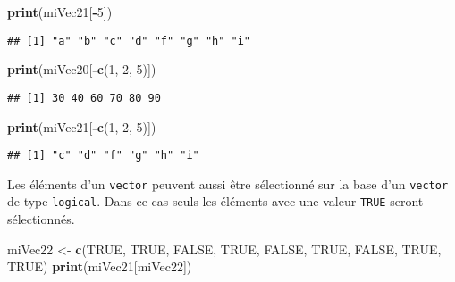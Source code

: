 \documentclass[]{book}
\newenvironment{Shaded}{\begin{snugshade}}{\end{snugshade}}
\newcommand{\KeywordTok}[1]{\textcolor[rgb]{0.13,0.29,0.53}{\textbf{#1}}}
\newcommand{\DecValTok}[1]{\textcolor[rgb]{0.00,0.00,0.81}{#1}}
\newcommand{\StringTok}[1]{\textcolor[rgb]{0.31,0.60,0.02}{#1}}
\newcommand{\OtherTok}[1]{\textcolor[rgb]{0.56,0.35,0.01}{#1}}
\newcommand{\OperatorTok}[1]{\textcolor[rgb]{0.81,0.36,0.00}{\textbf{#1}}}
\newcommand{\NormalTok}[1]{#1}
\theoremstyle{definition}
\theoremstyle{definition}
\theoremstyle{definition}
\theoremstyle{remark}
\begin{document}
\begin{Shaded}
\begin{Highlighting}[]
\KeywordTok{print}\NormalTok{(miVec21[}\OperatorTok{-}\DecValTok{5}\NormalTok{])}
\end{Highlighting}
\end{Shaded}

\begin{verbatim}
## [1] "a" "b" "c" "d" "f" "g" "h" "i"
\end{verbatim}

\begin{Shaded}
\begin{Highlighting}[]
\KeywordTok{print}\NormalTok{(miVec20[}\OperatorTok{-}\KeywordTok{c}\NormalTok{(}\DecValTok{1}\NormalTok{, }\DecValTok{2}\NormalTok{, }\DecValTok{5}\NormalTok{)])}
\end{Highlighting}
\end{Shaded}

\begin{verbatim}
## [1] 30 40 60 70 80 90
\end{verbatim}

\begin{Shaded}
\begin{Highlighting}[]
\KeywordTok{print}\NormalTok{(miVec21[}\OperatorTok{-}\KeywordTok{c}\NormalTok{(}\DecValTok{1}\NormalTok{, }\DecValTok{2}\NormalTok{, }\DecValTok{5}\NormalTok{)])}
\end{Highlighting}
\end{Shaded}

\begin{verbatim}
## [1] "c" "d" "f" "g" "h" "i"
\end{verbatim}

Les éléments d'un \texttt{vector} peuvent aussi être sélectionné sur la
base d'un \texttt{vector} de type \texttt{logical}. Dans ce cas seuls
les éléments avec une valeur \texttt{TRUE} seront sélectionnés.

\begin{Shaded}
\begin{Highlighting}[]
\NormalTok{miVec22 <-}\StringTok{ }\KeywordTok{c}\NormalTok{(}\OtherTok{TRUE}\NormalTok{, }\OtherTok{TRUE}\NormalTok{, }\OtherTok{FALSE}\NormalTok{, }\OtherTok{TRUE}\NormalTok{, }\OtherTok{FALSE}\NormalTok{, }\OtherTok{TRUE}\NormalTok{, }\OtherTok{FALSE}\NormalTok{, }\OtherTok{TRUE}\NormalTok{, }\OtherTok{TRUE}\NormalTok{)}
\KeywordTok{print}\NormalTok{(miVec21[miVec22])}
\end{Highlighting}
\end{Shaded}
\end{document}
